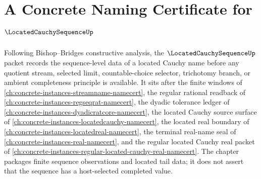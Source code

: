 \chapter{A Concrete Naming Certificate for $\LocatedCauchySequenceUp$}
\label{ch:concrete-instances-located-cauchy-sequence-namecert}

Following Bishop--Bridges constructive analysis, the $\LocatedCauchySequenceUp$ packet records the sequence-level data of a located Cauchy name before any quotient stream, selected limit, countable-choice selector, trichotomy branch, or ambient completeness principle is available. It sits after the finite windows of \autoref{ch:concrete-instances-streamname-namecert}, the regular rational readback of \autoref{ch:concrete-instances-regseqrat-namecert}, the dyadic tolerance ledger of \autoref{ch:concrete-instances-dyadicratcore-namecert}, the located Cauchy source surface of \autoref{ch:concrete-instances-locatedcauchy-namecert}, the located real boundary of \autoref{ch:concrete-instances-locatedreal-namecert}, the terminal real-name seal of \autoref{ch:concrete-instances-real-namecert}, and the regular located Cauchy real packet of \autoref{ch:concrete-instances-regular-located-cauchy-real-namecert}. The chapter packages finite sequence observations and located tail data; it does not assert that the sequence has a host-selected completed value.

